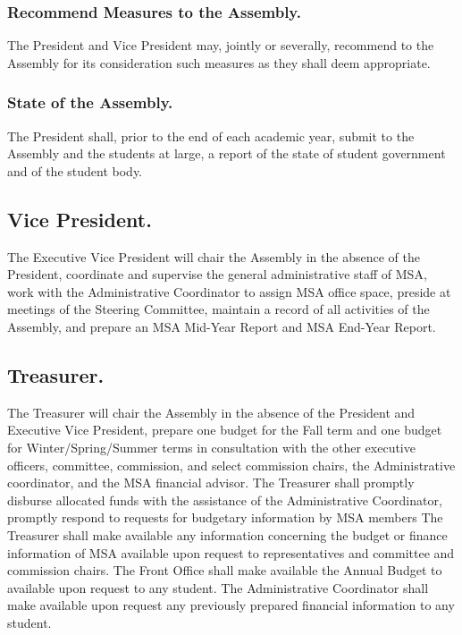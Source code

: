 \subsubsection{Recommend Measures to the Assembly.}
The President and Vice President may, jointly or severally, recommend to the Assembly for its consideration such measures as they shall deem appropriate.

\subsubsection{State of the Assembly.}
The President shall, prior to the end of each academic year, submit to the Assembly and the students at large, a report of the state of student government and of the student body.


\subsection{Vice President.}
The Executive Vice President will chair the Assembly in the absence of the President, coordinate and supervise the general administrative staff of MSA, work with the Administrative Coordinator to assign MSA office space, preside at meetings of the Steering Committee, maintain a record of all activities of the Assembly, and prepare an MSA Mid-Year Report and MSA End-Year Report.

\subsection{Treasurer.}
The Treasurer will chair the Assembly in the absence of the President and Executive Vice President, prepare one budget for the Fall term and one budget for Winter/Spring/Summer terms in consultation with the other executive officers, committee, commission, and select commission chairs, the Administrative coordinator, and the MSA financial advisor. The Treasurer shall promptly disburse allocated funds with the assistance of the Administrative Coordinator, promptly respond to requests for budgetary information by MSA members The Treasurer shall make available any information concerning the budget or finance information of MSA available upon request to representatives and committee and commission chairs. The Front Office shall make available the Annual Budget to available upon request to any student. The Administrative Coordinator shall make available upon request any previously prepared financial information to any student. 

